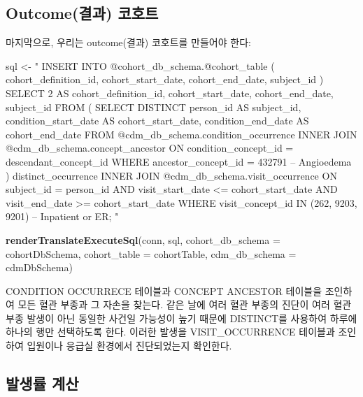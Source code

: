 \documentclass[11pt]{book}
\newenvironment{Shaded}{\begin{snugshade}}{\end{snugshade}}
\newcommand{\KeywordTok}[1]{\textcolor[rgb]{0.13,0.29,0.53}{\textbf{#1}}}
\newcommand{\DataTypeTok}[1]{\textcolor[rgb]{0.13,0.29,0.53}{#1}}
\newcommand{\StringTok}[1]{\textcolor[rgb]{0.31,0.60,0.02}{#1}}
\newcommand{\NormalTok}[1]{#1}
\theoremstyle{definition}
\theoremstyle{definition}
\theoremstyle{definition}
\theoremstyle{remark}
\begin{document}
\subsection{Outcome(결과) 코호트}\label{outcome-}

마지막으로, 우리는 outcome(결과) 코호트를 만들어야 한다:

\begin{Shaded}
\begin{Highlighting}[]
\NormalTok{sql <-}\StringTok{ "}
\StringTok{INSERT INTO @cohort_db_schema.@cohort_table (}
\StringTok{ cohort_definition_id,}
\StringTok{ cohort_start_date,}
\StringTok{ cohort_end_date,}
\StringTok{subject_id}
\StringTok{)}
\StringTok{SELECT 2 AS cohort_definition_id,}
\StringTok{  cohort_start_date,}
\StringTok{  cohort_end_date,}
\StringTok{  subject_id}
\StringTok{FROM (}
\StringTok{  SELECT DISTINCT person_id AS subject_id,}
\StringTok{    condition_start_date AS cohort_start_date,}
\StringTok{    condition_end_date AS cohort_end_date}
\StringTok{  FROM @cdm_db_schema.condition_occurrence}
\StringTok{  INNER JOIN @cdm_db_schema.concept_ancestor}
\StringTok{    ON condition_concept_id = descendant_concept_id}
\StringTok{  WHERE ancestor_concept_id = 432791 -- Angioedema}
\StringTok{) distinct_occurrence}
\StringTok{INNER JOIN @cdm_db_schema.visit_occurrence}
\StringTok{  ON subject_id = person_id}
\StringTok{  AND visit_start_date <= cohort_start_date}
\StringTok{  AND visit_end_date >= cohort_start_date}
\StringTok{WHERE visit_concept_id IN (262, 9203,}
\StringTok{    9201) -- Inpatient or ER;}
\StringTok{"}

\KeywordTok{renderTranslateExecuteSql}\NormalTok{(conn, sql,}
                          \DataTypeTok{cohort_db_schema =}\NormalTok{ cohortDbSchema,}
                          \DataTypeTok{cohort_table =}\NormalTok{ cohortTable,}
                          \DataTypeTok{cdm_db_schema =}\NormalTok{ cdmDbSchema)}
\end{Highlighting}
\end{Shaded}

CONDITION OCCURRECE 테이블과 CONCEPT ANCESTOR 테이블을 조인하여 모든
혈관 부종과 그 자손을 찾는다. 같은 날에 여러 혈관 부종의 진단이 여러
혈관 부종 발생이 아닌 동일한 사건일 가능성이 높기 때문에 DISTINCT를
사용하여 하루에 하나의 행만 선택하도록 한다. 이러한 발생을
VISIT\_OCCURRENCE 테이블과 조인하여 입원이나 응급실 환경에서
진단되었는지 확인한다.

\subsection{발생률 계산}\label{-}
\end{document}

